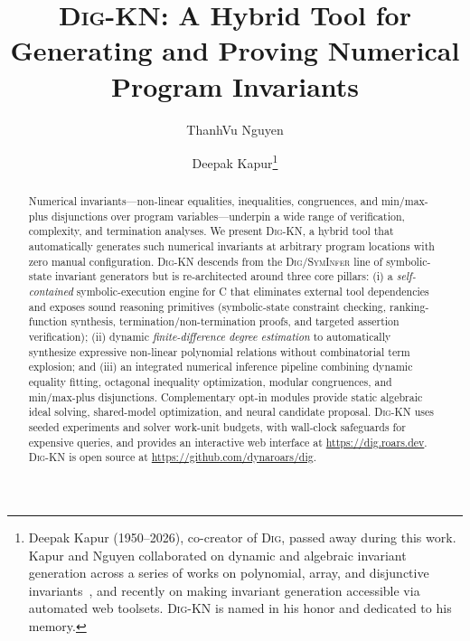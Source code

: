 \documentclass[runningheads]{llncs}
\newcommand{\tool}{\textsc{Dig-KN}\xspace}
\newcommand{\digold}{\textsc{Dig/SymInfer}\xspace}
\begin{document}
\title{\textsc{Dig-KN}: A Hybrid Tool for Generating and Proving Numerical Program Invariants}
%
%
\author{ThanhVu Nguyen \and
         Deepak Kapur\thanks{Deepak Kapur (1950--2026), co-creator of
         \textsc{Dig}, passed away during this work.  Kapur and Nguyen collaborated
         on dynamic and algebraic invariant generation across a series of works
         on polynomial, array, and disjunctive invariants~\cite{nguyen2009dig,nguyen2012dig,nguyen2014dig,nguyen2014tosem},
         and recently on making invariant generation accessible via automated web toolsets.
         \textsc{Dig-KN} is named in his honor and dedicated to his memory.}}

\maketitle

\begin{abstract}
Numerical invariants---non-linear equalities, inequalities, congruences, and
min/max-plus disjunctions over program variables---underpin a wide
range of verification, complexity, and termination analyses.  We present
\tool{}, a hybrid tool that automatically generates such numerical invariants
at arbitrary program locations with zero manual configuration.  \tool{} descends from the \digold{} line of
symbolic-state invariant generators but is re-architected around three core pillars:
(i) a \emph{self-contained} symbolic-execution engine for C that eliminates external tool dependencies
and exposes sound reasoning primitives (symbolic-state constraint checking, ranking-function synthesis, termination/non-termination proofs, and targeted assertion verification);
(ii) dynamic \emph{finite-difference degree estimation} to automatically synthesize expressive non-linear polynomial relations without combinatorial term explosion; and
(iii) an integrated numerical inference pipeline combining dynamic equality fitting, octagonal inequality optimization, modular congruences, and min/max-plus disjunctions.
Complementary opt-in modules provide static algebraic ideal solving, shared-model optimization, and neural candidate proposal.
\tool{} uses seeded experiments and solver work-unit budgets, with wall-clock safeguards for expensive queries, and provides an interactive web interface at \url{https://dig.roars.dev}.  \tool{} is open source at \url{https://github.com/dynaroars/dig}.
\end{abstract}
\end{document}
